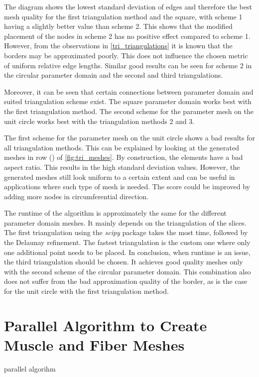 The diagram shows the lowest standard deviation of edges and therefore the best mesh quality for the first triangulation method and the square, with scheme 1 having a slightly better value than scheme 2. This shows that the modified placement of the nodes in scheme 2 has no positive effect compared to scheme 1.
However, from the observations in \cref{tri_triangulations} it is known that the borders may be approximated poorly. This does not influence the chosen metric of uniform relative edge lengths.
Similar good results can be seen for scheme 2 in the circular parameter domain and the second and third triangulations.

Moreover, it can be seen that certain connections between parameter domain and suited triangulation scheme exist. The square parameter domain works best with the first triangulation method. The second scheme for the parameter mesh on the unit circle works best with the triangulation methods 2 and 3.

The first scheme for the parameter mesh on the unit circle shows a bad results for all triangulation methods. This can be explained by looking at the generated meshes in row () of \cref{fig:tri_meshes}. By construction, the elements have a bad aspect ratio. This results in the high standard deviation values. However, the generated meshes still look uniform to a certain extent and can be useful in applications where such type of mesh is needed. The score could be improved by adding more nodes in circumferential direction.

The runtime of the algorithm is approximately the same for the different parameter domain meshes. It mainly depends on the triangulation of the slices. The first triangulation using the \emph{scipy} package takes the most time, followed by the Delaunay refinement. The fastest triangulation is the custom one where only one additional point needs to be placed. In conclusion, when runtime is an issue, the third triangulation should be chosen. It achieves good quality meshes only with the second scheme of the circular parameter domain. This combination also does not suffer from the bad approximation quality of the border, as is the case for the unit circle with the first triangulation method.

\section{Parallel Algorithm to Create Muscle and Fiber Meshes}\label{sec:parallel_algorithm}
parallel algorihm

